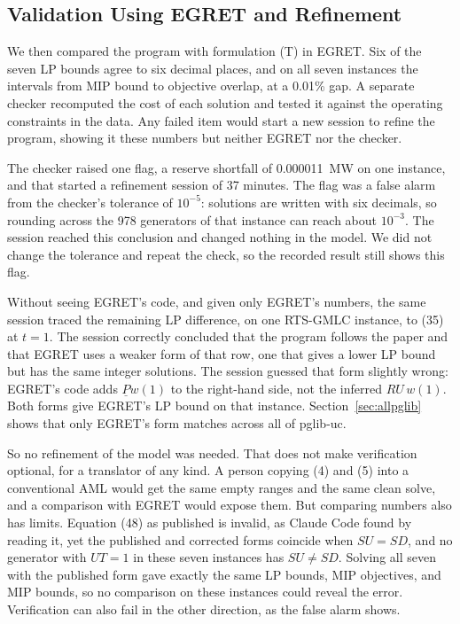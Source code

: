 \documentclass[11pt]{article}
\newcommand{\Pmin}{\underline{P}}
\begin{document}
\subsection{Validation Using EGRET and Refinement}
\label{sec:validation}

We then compared the program with formulation (T) in EGRET. Six of the seven LP bounds agree to six decimal places, and on all seven instances the intervals from MIP bound to objective overlap, at a 0.01\% gap. A separate checker recomputed the cost of each solution and tested it against the operating constraints in the data. Any failed item would start a new session to refine the program, showing it these numbers but neither EGRET nor the checker.

The checker raised one flag, a reserve shortfall of 0.000011~MW on one instance, and that started a refinement session of 37 minutes. The flag was a false alarm from the checker's tolerance of $10^{-5}$: solutions are written with six decimals, so rounding across the 978 generators of that instance can reach about $10^{-3}$. The session reached this conclusion and changed nothing in the model. We did not change the tolerance and repeat the check, so the recorded result still shows this flag.

Without seeing EGRET's code, and given only EGRET's numbers, the same session traced the remaining LP difference, on one RTS-GMLC instance, to (35) at $t=1$. The session correctly concluded that the program follows the paper and that EGRET uses a weaker form of that row, one that gives a lower LP bound but has the same integer solutions. The session guessed that form slightly wrong: EGRET's code adds $\Pmin w(1)$ to the right-hand side, not the inferred $RU\, w(1)$. Both forms give EGRET's LP bound on that instance. Section~\ref{sec:allpglib} shows that only EGRET's form matches across all of pglib-uc.

So no refinement of the model was needed. That does not make verification optional, for a translator of any kind. A person copying (4) and (5) into a conventional AML would get the same empty ranges and the same clean solve, and a comparison with EGRET would expose them. But comparing numbers also has limits. Equation (48) as published is invalid, as Claude Code found by reading it, yet the published and corrected forms coincide when $SU=SD$, and no generator with $UT=1$ in these seven instances has $SU \ne SD$. Solving all seven with the published form gave exactly the same LP bounds, MIP objectives, and MIP bounds, so no comparison on these instances could reveal the error. Verification can also fail in the other direction, as the false alarm shows.
\end{document}

